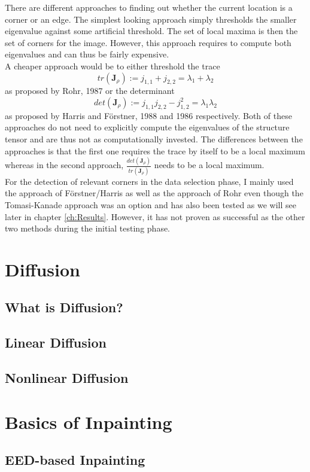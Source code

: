 There are different approaches to finding out whether the current location is a corner or an edge. The
simplest looking approach simply thresholds the smaller eigenvalue against some artificial
threshold. The set of local maxima is then the set of corners for the image\cite{shitomasi94}.
However, this approach requires to compute both eigenvalues and can thus be fairly expensive.\\
A cheaper approach would be to either threshold the trace \[tr(\mathbf{J}_\rho) := j_{1, 1} + j_{2,
        2} = \lambda_1 + \lambda_2\] as proposed by Rohr, 1987 or the determinant \[det(\mathbf{J}_\rho) := j_{1, 1}j_{2, 2} -
    j_{1, 2}^2 = \lambda_1\lambda_2\] as proposed by Harris and F\"orstner, 1988 and 1986
respectively\cite{harris88}. Both of these approaches do not need to explicitly compute the eigenvalues of
the structure tensor and are thus not as computationally invested. The differences between the
approaches is that the first one requires the trace by itself to be a local maximum whereas in the
second approach, $\frac{det(\mathbf{J}_\rho)}{tr(\mathbf{J}_\rho)}$ needs to be a local maximum.\\

For the detection of relevant corners in the data selection phase, I mainly used the approach of F\"orstner/Harris as well as
the approach of Rohr even though the Tomasi-Kanade approach was an option and has also been
tested as we will see later in chapter \ref{ch:Results}. However, it has not proven as successful
as the other two methods during the initial testing phase.
\section{Diffusion}\label{sec:Diffusion}
\subsection{What is Diffusion?}
\subsection{Linear Diffusion}
\subsection{Nonlinear Diffusion}\label{sub:NonlinearDiff}
\section{Basics of Inpainting}\label{sec:Inpainting}
\subsection{EED-based Inpainting}
